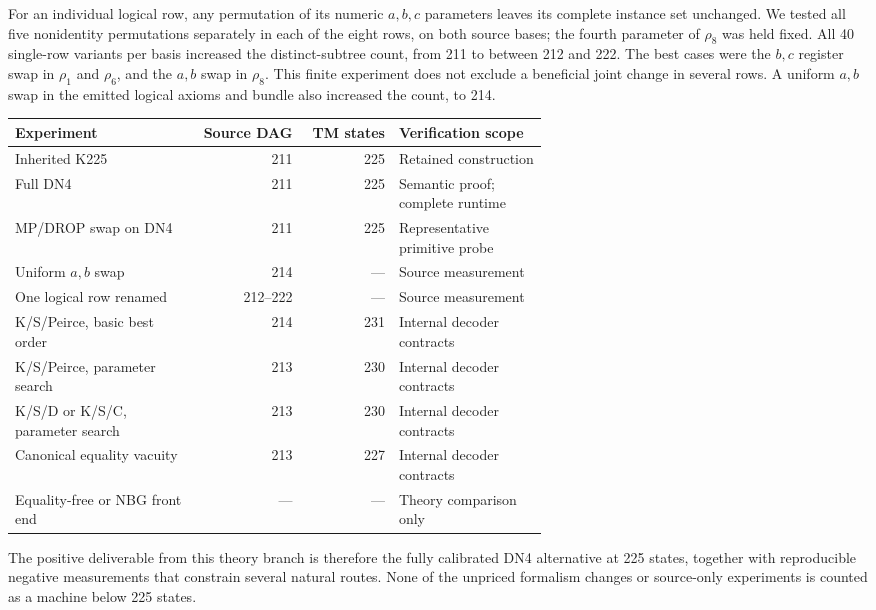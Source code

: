 For an individual logical row, any permutation of its numeric $a,b,c$
parameters leaves its complete instance set unchanged.  We tested all
five nonidentity permutations separately in each of the eight rows,
on both source bases; the fourth parameter of $\rho_8$ was held fixed.
All 40 single-row variants per basis increased the distinct-subtree
count, from 211 to between 212 and 222.  The best cases were the
$b,c$ register swap in $\rho_1$ and $\rho_6$, and the $a,b$ swap in $\rho_8$.
This finite experiment does not exclude a beneficial joint change in
several rows.  A uniform $a,b$ swap in the emitted logical axioms and
bundle also increased the count, to 214.

\begin{center}
\small
\begin{tabular}{p{0.34\linewidth}rrp{0.28\linewidth}}
\hline
Experiment & Source DAG & TM states & Verification scope\\
\hline
Inherited K225 & 211 & 225 & Retained construction\\
Full DN4 & 211 & 225 & Semantic proof; complete runtime\\
MP/DROP swap on DN4 & 211 & 225 & Representative primitive probe\\
Uniform $a,b$ swap & 214 & --- & Source measurement\\
One logical row renamed & 212--222 & --- & Source measurement\\
K/S/Peirce, basic best order & 214 & 231 & Internal decoder contracts\\
K/S/Peirce, parameter search & 213 & 230 & Internal decoder contracts\\
K/S/D or K/S/C, parameter search & 213 & 230 & Internal decoder contracts\\
Canonical equality vacuity & 213 & 227 & Internal decoder contracts\\
Equality-free or NBG front end & --- & --- & Theory comparison only\\
\hline
\end{tabular}
\end{center}

The positive deliverable from this theory branch is therefore the
fully calibrated DN4 alternative at 225 states, together with
reproducible negative measurements that constrain several natural
routes.  None of the unpriced formalism changes or source-only
experiments is counted as a machine below 225 states.
